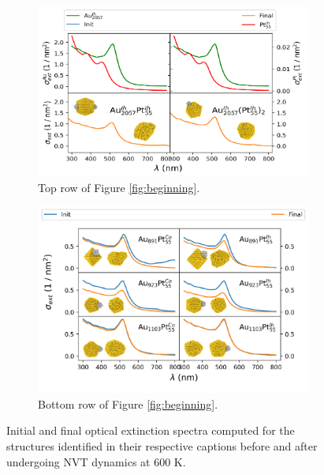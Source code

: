 \begin{figure}[ht!]
\begin{subfigure}{0.725\textwidth}
    \centering
    \includegraphics[width=\textwidth]{figures/MD/Coal/Micki_Specs.pdf}
    \caption{Top row of Figure \ref{fig:beginning}.}
    \label{fig:GDM_Micki}
\end{subfigure}
\begin{subfigure}{0.725\textwidth}
    \centering
    \includegraphics[width=\textwidth]{figures/MD/Coal/Seed_Spec.pdf}
    \caption{Bottom row of Figure \ref{fig:beginning}.}
    \label{fig:GDM_Long}
\end{subfigure}
    \caption{Initial and final optical extinction spectra computed for the structures identified in their respective captions before and after undergoing NVT dynamics at $600$ K.}
    \label{fig:GDM_Dyns}
\end{figure}


